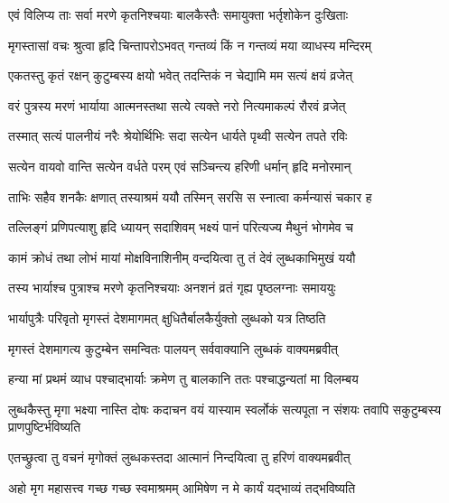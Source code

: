 \twolineshloka
{एवं विलिप्य ताः सर्वा मरणे कृतनिश्चयाः}
{बालकैस्तैः समायुक्ता भर्तृशोकेन दुःखिताः}%

\twolineshloka
{मृगस्तासां वचः श्रुत्वा हृदि चिन्तापरोऽभवत्}
{गन्तव्यं किं न गन्तव्यं मया व्याधस्य मन्दिरम्}%

\twolineshloka
{एकतस्तु कृतं रक्षन् कुटुम्बस्य\footnotemark{} क्षयो भवेत्}
{तदन्तिकं न चेद्यामि मम सत्यं क्षयं व्रजेत्}%

\twolineshloka
{वरं पुत्रस्य मरणं भार्याया आत्मनस्तथा}
{सत्ये त्यक्ते नरो नित्यमाकल्पं रौरवं व्रजेत्}%

\twolineshloka
{तस्मात् सत्यं पालनीयं नरैः श्रेयोर्थिभिः सदा}
{सत्येन धार्यते पृथ्वी सत्येन तपते रविः}%

\twolineshloka
{सत्येन वायवो वान्ति सत्येन वर्धते परम्}
{एवं सञ्चिन्त्य हरिणी धर्मान् हृदि मनोरमान्}%

\twolineshloka
{ताभिः सहैव शनकैः क्षणात् तस्याश्रमं ययौ}
{तस्मिन् सरसि स स्नात्वा कर्मन्यासं चकार ह}%

\twolineshloka
{तल्लिङ्गं प्रणिपत्याशु हृदि ध्यायन् सदाशिवम्}
{भक्ष्यं पानं परित्यज्य मैथुनं भोगमेव च}%

\twolineshloka
{कामं क्रोधं तथा लोभं मायां मोक्षविनाशिनीम्}
{वन्दयित्वा\footnotemark{} तु तं देवं लुब्धकाभिमुखं ययौ}%

\twolineshloka
{तस्य भार्याश्च पुत्राश्च मरणे कृतनिश्चयाः}
{अनशनं व्रतं गृह्य पृष्ठलग्नाः समाययुः}%

\twolineshloka
{भार्यापुत्रैः परिवृतो मृगस्तं देशमागमत्}
{क्षुधितैर्बालकैर्युक्तो लुब्धको यत्र तिष्ठति}%

\twolineshloka
{मृगस्तं देशमागत्य कुटुम्बेन समन्वितः}
{पालयन् सर्ववाक्यानि\footnotemark{} लुब्धकं वाक्यमब्रवीत्}%


\twolineshloka
{हन्या मां प्रथमं व्याध पश्चाद्भार्याः क्रमेण तु}
{बालकानि ततः पश्चाद्धन्यतां मा विलम्बय}%

\threelineshloka
{लुब्धकैस्तु मृगा भक्ष्या नास्ति दोषः कदाचन}
{वयं यास्याम स्वर्लोकं सत्यपूता न संशयः}%
{तवापि सकुटुम्बस्य प्राणपुष्टिर्भविष्यति}

\twolineshloka
{एतच्छ्रुत्वा तु वचनं मृगोक्तं लुब्धकस्तदा}
{आत्मानं निन्दयित्वा तु हरिणं वाक्यमब्रवीत्}%


\twolineshloka
{अहो मृग महासत्त्व गच्छ गच्छ स्वमाश्रमम्}
{आमिषेण न मे कार्यं यद्भाव्यं तद्भविष्यति}%


